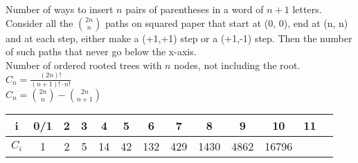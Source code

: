 Number of ways to insert $n$ pairs of parentheses in a word of $n+1$ letters. \\

Consider all the ${2n}\choose{n}$ paths on squared paper that start at (0, 0), end at (n, n) and at each step, either make a (+1,+1) step or a (+1,-1) step. Then the number of such paths that never go below the x-axis. \\

Number of ordered rooted trees with $n$ nodes, not including the root. \\

$C_n = \frac{(2n)!}{(n+1)!\cdot n!}$ \\

$C_n = {{2n}\choose{n}} - {{2n}\choose{n+1}}$ \\

\begin{tabular}{ |c|c|c|c|c|c|c|c|c|c|c|c|c|  }
\hline  
i & 0/1 & 2 & 3 & 4 &5 & 6 & 7 & 8 & 9 & 10 & 11 \\
\hline
$C_{i}$ & 1 & 2 & 5 & 14 & 42 & 132 & 429 & 1430 & 4862 & 16796 \\
\end{tabular}

\vspace{10pt}